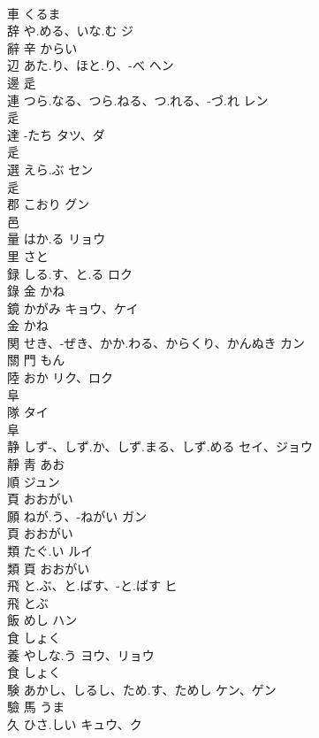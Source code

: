 \documentclass[8pt]{extreport}
\begin{document}
\begin{CJK}{UTF8}{min}
\\	車		くるま		
\\	辞	や.める、いな.む	ジ	
\\	辭	辛		からい		
\\	辺	あた.り、ほと.り、-べ	ヘン	
\\	邊	辵				
\\	連	つら.なる、つら.ねる、つ.れる、-づ.れ	レン	
\\	辵				
\\	達	-たち	タツ、ダ	
\\	辵				
\\	選	えら.ぶ	セン	
\\	辵				
\\	郡	こおり	グン	
\\	邑				
\\	量	はか.る	リョウ	
\\	里		さと		
\\	録	しる.す、と.る	ロク	
\\	錄	金		かね		
\\	鏡	かがみ	キョウ、ケイ	
\\	金		かね		
\\	関	せき、-ぜき、かか.わる、からくり、かんぬき	カン	
\\	關	門		もん		
\\	陸	おか	リク、ロク	
\\	阜				
\\	隊		タイ	
\\	阜				
\\	静	しず-、しず.か、しず.まる、しず.める	セイ、ジョウ	
\\	靜	靑		あお		
\\	順		ジュン	
\\	頁		おおがい		
\\	願	ねが.う、-ねがい	ガン	
\\	頁		おおがい		
\\	類	たぐ.い	ルイ	
\\	類	頁		おおがい		
\\	飛	と.ぶ、と.ばす、-と.ばす	ヒ	
\\	飛		とぶ		
\\	飯	めし	ハン	
\\	食		しょく		
\\	養	やしな.う	ヨウ、リョウ	
\\	食		しょく		
\\	験	あかし、しるし、ため.す、ためし	ケン、ゲン	
\\	驗	馬		うま		
\\	久	ひさ.しい	キュウ、ク	

\end{CJK}
\end{document}
